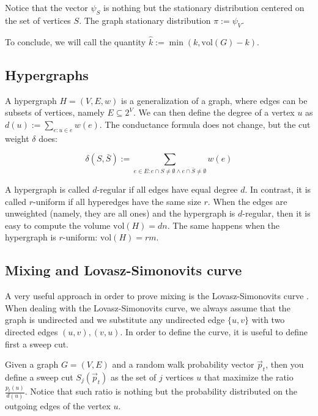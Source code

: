 \documentclass[../main.tex]{subfiles}
\begin{document}
    Notice that the vector $\psi_S$ is nothing but the stationary distribution centered on the set of vertices $S$. The graph stationary distribution $\pi := \psi_V$.
    
    To conclude, we will call the quantity $\hat{k} := \min(k, \text{vol}(G) - k)$.
    
\subsection{Hypergraphs}
\label{subsec:definitions_hypergraphs}
    
    A hypergraph $H=(V,E,w)$ is a generalization of a graph, where edges can be subsets of vertices, namely $E\subseteq 2^V$. We can then define the degree of a vertex $u$ as $d(u) := \sum_{e: u\in e}w(e)$. The conductance formula does not change, but the cut weight $\delta$ does:
    
    \begin{equation}
        \delta(S, \bar{S}) := \sum_{e \in E: e\cap S \neq \emptyset \land e\cap\bar{S} \neq \emptyset} w(e)
    \end{equation}
    
    A hypergraph is called $d$-regular if all edges have equal degree $d$. In contrast, it is called $r$-uniform if all hyperedges have the same size $r$. When the edges are unweighted (namely, they are all ones) and the hypergraph is $d$-regular, then it is easy to compute the volume $\text{vol}(H) = dn$. The same happens when the hypergraph is $r$-uniform: $\text{vol}(H) = rm$.
    
\subsection{Mixing and Lovasz-Simonovits curve}
\label{subsec:definitions_mixing_ls_curve}

    A very useful approach in order to prove mixing is the Lovasz-Simonovits curve \cite{Lovsz1993RandomWI}. When dealing with the Lovasz-Simonovits curve, we always assume that the graph is undirected and we substitute any undirected edge $\{u,v\}$ with two directed edges $(u,v), (v,u)$. In order to define the curve, it is useful to define first a sweep cut. 
    
    Given a graph $G=(V,E)$ and a random walk probability vector $\vec{p}_t$, then you define a sweep cut $S_j(\vec{p}_t)$ as the set of $j$ vertices $u$ that maximize the ratio $\frac{p_t(u)}{d(u)}$. Notice that such ratio is nothing but the probability distributed on the outgoing edges of the vertex $u$.
    
\end{document}
